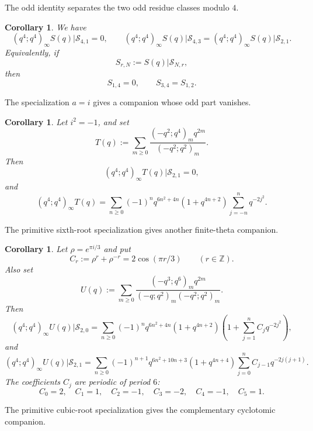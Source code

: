 \documentclass[11pt]{amsart}
\newtheorem{corollary}[theorem]{Corollary}
\theoremstyle{remark}
\newcommand{\Z}{\mathbb Z}
\newcommand{\sieve}[2]{\mathcal S_{#1,#2}}
\begin{document}
The odd identity separates the two odd residue classes modulo $4$.

\begin{corollary}\label{cor:residue}
We have
\[
(q^4;q^4)_\infty S(q)\big|\sieve{4}{1}=0,
\qquad
(q^4;q^4)_\infty S(q)\big|\sieve{4}{3}
=(q^4;q^4)_\infty S(q)\big|\sieve{2}{1}.
\]
Equivalently, if
\[
S_{r,N}:=S(q)\big|\sieve{N}{r},
\]
then
\begin{equation}\label{S14-S34}
S_{1,4}=0,
\qquad
S_{3,4}=S_{1,2}.
\end{equation}
\end{corollary}

The specialization $a=i$ gives a companion whose odd part vanishes.

\begin{corollary}\label{cor:i}
Let $i^2=-1$, and set
\[
T(q):=\sum_{m\ge0}\frac{(-q^2;q^4)_m q^{2m}}{(-q^2;q^2)_m}.
\]
Then
\begin{equation}\label{i-vanishing}
(q^4;q^4)_\infty T(q)\big|\sieve{2}{1}=0,
\end{equation}
and
\begin{equation}\label{i-companion}
(q^4;q^4)_\infty T(q)
=
\sum_{n\ge0}(-1)^nq^{6n^2+4n}(1+q^{4n+2})
\sum_{j=-n}^{n}q^{-2j^2}.
\end{equation}
\end{corollary}

The primitive sixth-root specialization gives another finite-theta companion.

\begin{corollary}\label{cor:rho}
Let $\rho=e^{\pi i/3}$ and put
\[
C_r:=\rho^r+\rho^{-r}=2\cos(\pi r/3)\qquad(r\in\Z).
\]
Also set
\[
U(q):=\sum_{m\ge0}
\frac{(-q^3;q^6)_m q^{2m}}
{(-q;q^2)_m(-q^2;q^2)_m}.
\]
Then
\begin{equation}\label{rho-even}
(q^4;q^4)_\infty U(q)\big|\sieve{2}{0}
=
\sum_{n\ge0}(-1)^nq^{6n^2+4n}(1+q^{4n+2})
\left(1+\sum_{j=1}^{n}C_jq^{-2j^2}\right),
\end{equation}
and
\begin{equation}\label{rho-odd}
(q^4;q^4)_\infty U(q)\big|\sieve{2}{1}
=
\sum_{n\ge0}(-1)^{n+1}q^{6n^2+10n+3}(1+q^{4n+4})
\sum_{j=0}^{n}C_{j-1}q^{-2j(j+1)}.
\end{equation}
The coefficients $C_j$ are periodic of period $6$:
\[
C_0=2,\quad C_1=1,\quad C_2=-1,\quad C_3=-2,\quad
C_4=-1,\quad C_5=1.
\]
\end{corollary}

The primitive cubic-root specialization gives the complementary cyclotomic companion.
\end{document}

